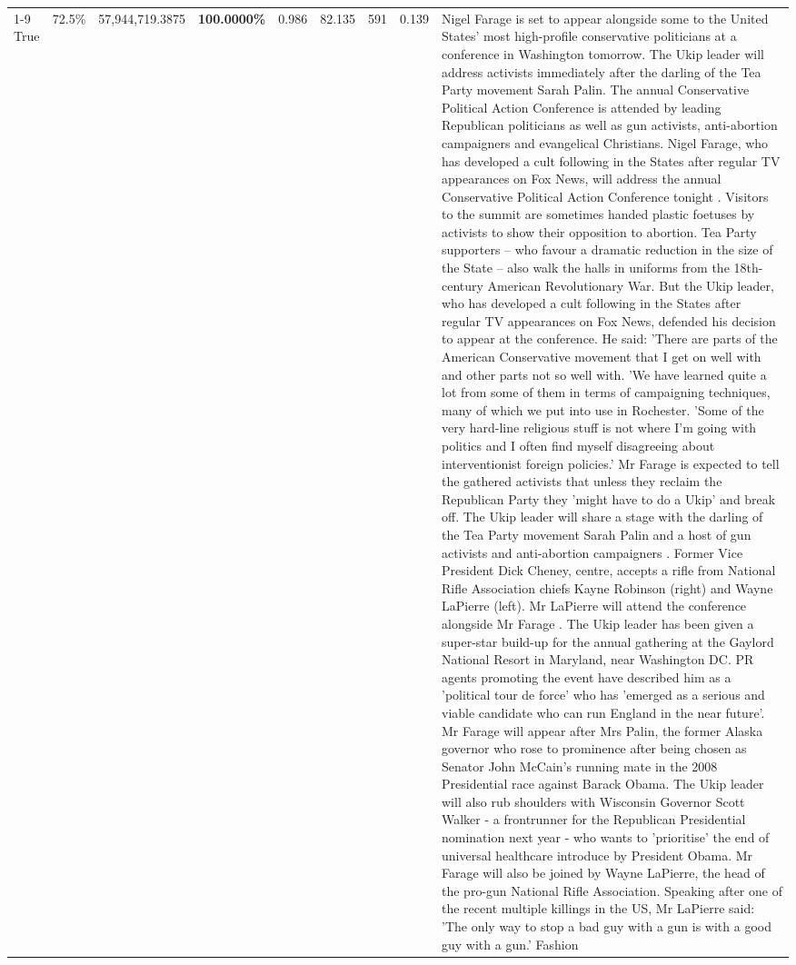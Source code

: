 \begin{table}[H]
\begin{tabular}{lllrlllll}
\cline{1-9} \cline{2-9}
True & 72.5\% & 57,944,719.3875 & \bfseries \color{red} 100.0000\% & 0.986 & 82.135 & 591 & 0.139 & Nigel Farage is set to appear alongside some to the United States' most high-profile conservative politicians at a conference in Washington tomorrow. The Ukip leader will address activists immediately after the darling of the Tea Party movement Sarah Palin. The annual Conservative Political Action Conference is attended by leading Republican politicians as well as gun activists, anti-abortion campaigners and evangelical Christians. Nigel Farage, who has developed a cult following in the States after regular TV appearances on Fox News, will address the annual Conservative Political Action Conference tonight . Visitors to the summit are sometimes handed plastic foetuses by activists to show their opposition to abortion. Tea Party supporters – who favour a dramatic reduction in the size of the State – also walk the halls in uniforms from the 18th-century American Revolutionary War. But the Ukip leader, who has developed a cult following in the States after regular TV appearances on Fox News, defended his decision to appear at the conference. He said: 'There are parts of the American Conservative movement that I get on well with and other parts not so well with. 'We have learned quite a lot from some of them in terms of campaigning techniques, many of which we put into use in Rochester. 'Some of the very hard-line religious stuff is not where I'm going with politics and I often find myself disagreeing about interventionist foreign policies.' Mr Farage is expected to tell the gathered activists that unless they reclaim the Republican Party they 'might have to do a Ukip' and break off. The Ukip leader will share a stage with the darling of the Tea Party movement Sarah Palin and a host of gun activists and anti-abortion campaigners . Former Vice President Dick Cheney, centre, accepts a rifle from National Rifle Association chiefs Kayne Robinson (right) and Wayne LaPierre (left). Mr LaPierre will attend the conference alongside Mr Farage . The Ukip leader has been given a super-star build-up for the annual gathering at the Gaylord National Resort in Maryland, near Washington DC. PR agents promoting the event have described him as a 'political tour de force' who has 'emerged as a serious and viable candidate who can run England in the near future'. Mr Farage will appear after Mrs Palin, the former Alaska governor who rose to prominence after being chosen as Senator John McCain's running mate in the 2008 Presidential race against Barack Obama. The Ukip leader will also rub shoulders with Wisconsin Governor Scott Walker - a frontrunner for the Republican Presidential nomination next year - who wants to 'prioritise' the end of universal healthcare introduce by President Obama. Mr Farage will also be joined by Wayne LaPierre, the head of the pro-gun National Rifle Association. Speaking after one of the recent multiple killings in the US, Mr LaPierre said: 'The only way to stop a bad guy with a gun is with a good guy with a gun.' Fashion \\

\end{tabular}
\end{table}
